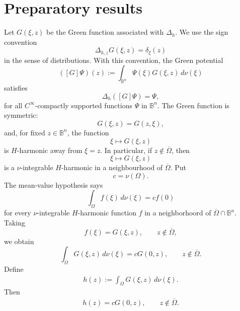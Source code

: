 \documentclass[12pt]{amsart}
\numberwithin{equation}{section}
\newcommand{\Bn}{\mathbb B^n}
\newcommand{\Dh}{\Delta_h}
\theoremstyle{plain}
\numberwithin{equation}{section}
\numberwithin{theorem}{section}
\numberwithin{proposition}{section}
\begin{document}
\section{Preparatory results}

Let \(G(\xi,z)\) be the Green function associated with \(\Dh\). We use the
sign convention
\[
\Delta_{h,z} G(\xi,z)=\delta_\xi(z)
\]
in the sense of distributions. With this convention, the Green potential
\[
([G]\Psi)(z):=\int_{\Bn}\Psi(\xi)G(\xi,z)\,d\nu(\xi)
\]
satisfies
\[
\Dh ([ G]\Psi)=\Psi,
\]
for all $C^\infty$-compactly supported functions $\Psi$ in $\Bn.$
The Green function is symmetric:
\[
G(\xi,z)=G(z,\xi),
\]
and, for fixed \(z \in \mathbb B^n\), the function
\[
\xi\longmapsto G(\xi,z)
\]
is \(H\)-harmonic away from \(\xi=z\).
In particular, if \(z\notin\overline{\Omega}\), then
\[
\xi\longmapsto G(\xi,z)
\]
is a $\nu$-integrable \(H\)-harmonic in a neighbourhood of \(\overline{\Omega}\).
Put
\[
c=\nu(\Omega).
\]
The mean-value hypothesis says
\[
\int_\Omega f(\xi)\,d\nu(\xi)=c f(0)
\]
for every $\nu$-integrable \(H\)-harmonic function \(f\) in a neighborhoord of  \(\overline{\Omega}\cap\mathbb B^n\).
Taking
\[
f(\xi)=G(\xi,z),
\qquad z\notin\overline{\Omega},
\]
we obtain
\[
\int_\Omega G(\xi,z)\,d\nu(\xi)=cG(0,z),
\qquad z\notin\overline{\Omega}.
\]
Define
\begin{eqnarray}\label{h}
h(z):=\int_\Omega G(\xi,z)\,d\nu(\xi).
\end{eqnarray}
Then
\begin{eqnarray}\label{hG}
h(z)=cG(0,z),
\qquad z\notin\overline{\Omega}.
\end{eqnarray}
\end{document}
